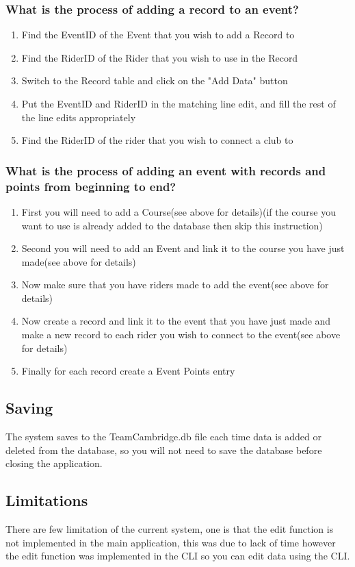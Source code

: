 \subsubsection{What is the process of adding a record to an event?}
\begin{enumerate}
\item Find the EventID of the Event that you wish to add a Record to
\item Find the RiderID of the Rider that you wish to use in the Record
\item Switch to the Record table and click on the "Add Data" button
\item Put the EventID and RiderID in the matching line edit, and fill the rest of the line edits appropriately
\item Find the RiderID of the rider that you wish to connect a club to
\end{enumerate}
\subsubsection{What is the process of adding an event with records and points from beginning to end?}
\begin{enumerate}
\item First you will need to add a Course(see above for details)(if the course you want to use is already added to the database then skip this instruction)
\item Second you will need to add an Event and link it to the course you have just made(see above for details)
\item Now make sure that you have riders made to add the event(see above for details)
\item Now create a record and link it to the event that you have just made and make a new record to each rider you wish to connect to the  event(see above for details)
\item Finally for each record create a Event Points entry
\end{enumerate}

\subsection{Saving}
The system saves to the TeamCambridge.db file each time data is added or deleted from the database, so you will not need to save the database before closing the application.
\subsection{Limitations}
There are few limitation of the current system, one is that the edit function is not implemented in the main application, this was due to lack of time however the edit function was implemented in the CLI so you can edit data using the CLI.


